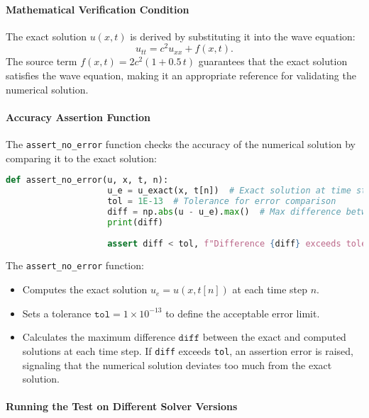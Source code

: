 \documentclass{article}
\begin{document}
			\paragraph{Mathematical Verification Condition}
			
			The exact solution \( u(x, t) \) is derived by substituting it into the wave equation:
			\[
			u_{tt} = c^2 u_{xx} + f(x, t).
			\]
			The source term \( f(x, t) = 2c^2(1 + 0.5 \, t) \) guarantees that the exact solution satisfies the wave equation, making it an appropriate reference for validating the numerical solution.
			
			\paragraph{Accuracy Assertion Function}
			
			The \texttt{assert\_no\_error} function checks the accuracy of the numerical solution by comparing it to the exact solution:
			\begin{lstlisting}[language=Python]
				def assert_no_error(u, x, t, n):
					u_e = u_exact(x, t[n])  # Exact solution at time step n
					tol = 1E-13  # Tolerance for error comparison
					diff = np.abs(u - u_e).max()  # Max difference between computed and exact
					print(diff)
					
					assert diff < tol, f"Difference {diff} exceeds tolerance at step {n}"
			\end{lstlisting}
			
			The \texttt{assert\_no\_error} function:
			\begin{itemize}
				\item Computes the exact solution \( u_e = u(x, t[n]) \) at each time step \( n \).
				\item Sets a tolerance \( \texttt{tol} = 1 \times 10^{-13} \) to define the acceptable error limit.
				\item Calculates the maximum difference \( \texttt{diff} \) between the exact and computed solutions at each time step. If \texttt{diff} exceeds \texttt{tol}, an assertion error is raised, signaling that the numerical solution deviates too much from the exact solution.
			\end{itemize}
			
			\paragraph{Running the Test on Different Solver Versions}
			
\end{document}
